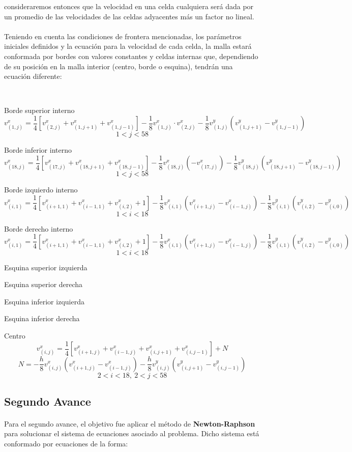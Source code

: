 \documentclass{article}
\begin{document}
  consideraremos entonces que la velocidad en una celda cualquiera será dada por un promedio de las velocidades de las celdas adyacentes más un factor no lineal.

  \paragraph{}
  Teniendo en cuenta las condiciones de frontera mencionadas, los parámetros iniciales definidos y la ecuación para la velocidad de cada celda, la malla estará conformada por bordes con valores constantes y celdas internas que, dependiendo de su posición en la malla interior (centro, borde o esquina), tendrán una ecuación diferente:

  \

  Borde superior interno
  \[v_{(1,j)}^x=\frac{1}{4}[v_{(2,j)}^x+v_{(1,j+1)}^x+v_{(1,j-1)}^x]-\frac{1}{8}v_{(1,j)}^x \cdot v_{(2,j)}^x-\frac{1}{8}v_{(1,j)}^y(v_{(1,j+1)}^y-v_{(1,j-1)}^y)\]
  \[1<j<58\]

  Borde inferior interno
  \[v_{(18,j)}^x=\frac{1}{4}[v_{(17,j)}^x+v_{(18,j+1)}^x+v_{(18,j-1)}^x]-\frac{1}{8}v_{(18,j)}^x(-v_{(17,j)}^x)-\frac{1}{8}v_{(18,j)}^y(v_{(18,j+1)}^y-v_{(18,j-1)}^y)\]
  \[1<j<58\]

  Borde izquierdo interno
  \[v_{(i,1)}^x=\frac{1}{4}[v_{(i+1,1)}^x+v_{(i-1,1)}^x+v_{(i,2)}^x+1]-\frac{1}{8}v_{(i,1)}^x(v_{(i+1,j)}^x-v_{(i-1,j)}^x)-\frac{1}{8}v_{(i,1)}^y(v_{(i,2)}^y-v_{(i,0)}^y)\]
  \[1<i<18\]

  Borde derecho interno
  \[v_{(i,1)}^x=\frac{1}{4}[v_{(i+1,1)}^x+v_{(i-1,1)}^x+v_{(i,2)}^x+1]-\frac{1}{8}v_{(i,1)}^x(v_{(i+1,j)}^x-v_{(i-1,j)}^x)-\frac{1}{8}v_{(i,1)}^y(v_{(i,2)}^y-v_{(i,0)}^y)\]
  \[1<i<18\]

  Esquina superior izquierda

  Esquina superior derecha

  Esquina inferior izquierda

  Esquina inferior derecha

  Centro
  \[v_{(i,j)}^x=\frac{1}{4}[v_{(i+1,j)}^x+v_{(i-1,j)}^x+v_{(i,j+1)}^x+v_{(i,j-1)}^x]+N\]
  \[N=-\frac{h}{8}v_{(i,j)}^x(v_{(i+1,j)}^x-v_{(i-1,j)}^x)-\frac{h}{8}v_{(i,j)}^y(v_{(i,j+1)}^y-v_{(i,j-1)}^y)\]
  \[2<i<18, \ 2<j<58\]

  \subsection*{Segundo Avance}
  \paragraph{}
  Para el segundo avance, el objetivo fue aplicar el método de \textbf{Newton-Raphson} para solucionar el sistema de ecuaciones asociado al problema. Dicho sistema está conformado por ecuaciones de la forma:
\end{document}
